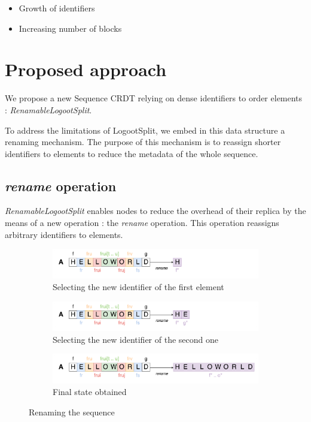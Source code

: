 \documentclass[sigplan,10pt]{acmart}
\begin{document}
\begin{itemize}
    \item Growth of identifiers
    \item Increasing number of blocks
\end{itemize}

\section{Proposed approach}

We propose a new Sequence \ac{CRDT} relying on dense identifiers to order elements : \emph{RenamableLogootSplit}.

To address the limitations of LogootSplit, we embed in this data structure a renaming mechanism.
The purpose of this mechanism is to reassign shorter identifiers to elements to reduce the metadata of the whole sequence.

\subsection{\emph{rename} operation}

\emph{RenamableLogootSplit} enables nodes to reduce the overhead of their replica by the means of a new operation : the \emph{rename} operation.
This operation reassigns arbitrary identifiers to elements.

\begin{figure}
    \centering
    \begin{subfigure}{0.45\textwidth}
        \includegraphics[width=1\textwidth]{img/renaming-first-id.png}
        \caption{Selecting the new identifier of the first element}
        \label{fig:renaming-first-id}
    \end{subfigure}
    \begin{subfigure}{0.45\textwidth}
        \includegraphics[width=1\textwidth]{img/renaming-second-id.png}
        \caption{Selecting the new identifier of the second one}
        \label{fig:renaming-second-id}
    \end{subfigure}
    \begin{subfigure}{0.45\textwidth}
        \includegraphics[width=1\textwidth]{img/renaming-final-state.png}
        \caption{Final state obtained}
        \label{fig:renaming-final-state}
    \end{subfigure}
    \caption{Renaming the sequence}
    \label{fig:renaming}
\end{figure}
\end{document}
